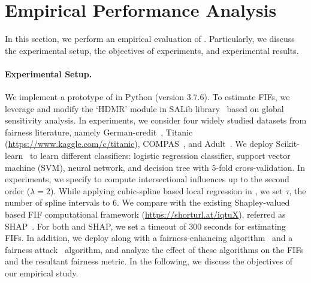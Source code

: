 \section{Empirical Performance Analysis}\label{fairness_fairXplainer_sec:experiments}
In this section, we perform an empirical evaluation of {\fairXplainer}. Particularly, we discuss the experimental setup, the objectives of experiments, and experimental results. 

\paragraph{Experimental Setup.} We implement a prototype of {\fairXplainer} in Python (version $ 3.7.6 $). To estimate FIFs, we leverage and modify the `HDMR' module in SALib library~\cite{Herman2017} based on global sensitivity analysis. In experiments, we consider four widely studied datasets from fairness literature, namely German-credit~\cite{DK2017},
Titanic (\url{https://www.kaggle.com/c/titanic}), COMPAS~\cite{angwin2016machine}, and Adult~\cite{DK2017uci}. We deploy Scikit-learn~\cite{scikit-learn} to learn different classifiers: logistic regression classifier, support vector machine (SVM), neural network, and decision tree with $ 5 $-fold cross-validation. In experiments, we specify {\fairXplainer} to compute intersectional influences up to the second order ($ \lambda = 2 $). While applying cubic-spline based local regression in {\fairXplainer}, we set $ \tau $, the number of spline intervals to $ 6 $. We compare {\fairXplainer} with the existing Shapley-valued based FIF computational framework (\url{https://shorturl.at/iqtuX}), referred as SHAP~\cite{lundberg2020explaining}. For both {\fairXplainer} and SHAP, we set a timeout of $ 300 $ seconds for estimating FIFs. In addition, we deploy {\fairXplainer} along with a fairness-enhancing algorithm~\cite{kamiran2012data} and a fairness attack~\cite{solans2020poisoning} algorithm, and analyze the effect of these algorithms on the FIFs and the resultant fairness metric. In the following, we discuss the objectives of our empirical study. 

